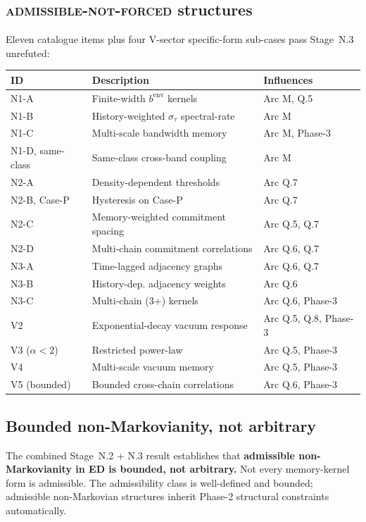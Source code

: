 \documentclass[11pt,a4paper]{article}
\begin{document}
\subsection{\textsc{admissible-not-forced} structures}

Eleven catalogue items plus four V-sector specific-form sub-cases pass Stage~N.3 unrefuted:
\begin{center}
\begin{tabular}{lll}
\hline
ID & Description & Influences \\
\hline
N1-A & Finite-width $b^\mathrm{env}$ kernels & Arc M, Q.5 \\
N1-B & History-weighted $\sigma_\tau$ spectral-rate & Arc M \\
N1-C & Multi-scale bandwidth memory & Arc M, Phase-3 \\
N1-D, same-class & Same-class cross-band coupling & Arc M \\
N2-A & Density-dependent thresholds & Arc Q.7 \\
N2-B, Case-P & Hysteresis on Case-P & Arc Q.7 \\
N2-C & Memory-weighted commitment spacing & Arc Q.5, Q.7 \\
N2-D & Multi-chain commitment correlations & Arc Q.6, Q.7 \\
N3-A & Time-lagged adjacency graphs & Arc Q.6, Q.7 \\
N3-B & History-dep. adjacency weights & Arc Q.6 \\
N3-C & Multi-chain (3+) kernels & Arc Q.6, Phase-3 \\
V2 & Exponential-decay vacuum response & Arc Q.5, Q.8, Phase-3 \\
V3 ($\alpha < 2$) & Restricted power-law & Arc Q.5, Phase-3 \\
V4 & Multi-scale vacuum memory & Arc Q.5, Phase-3 \\
V5 (bounded) & Bounded cross-chain correlations & Arc Q.6, Phase-3 \\
\hline
\end{tabular}
\end{center}

\subsection{Bounded non-Markovianity, not arbitrary}

The combined Stage~N.2 + N.3 result establishes that \textbf{admissible non-Markovianity in ED is bounded, not arbitrary.} Not every memory-kernel form is admissible. The admissibility class is well-defined and bounded; admissible non-Markovian structures inherit Phase-2 structural constraints automatically.
\end{document}
